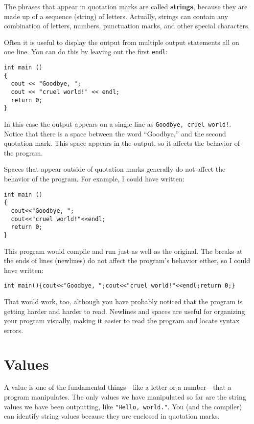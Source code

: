 
The phrases that appear in quotation marks are called {\bf strings},
because they are made up of a sequence (string) of letters.  Actually,
strings can contain any combination of letters, numbers, punctuation
marks, and other special characters.


Often it is useful to display the output from multiple output
statements all on one line.  You can do this by leaving out
the first {\tt endl}:

\begin{lstlisting}
int main ()
{
  cout << "Goodbye, ";
  cout << "cruel world!" << endl;
  return 0;
}
\end{lstlisting}
%
In this case the output appears on a single line as
{\tt Goodbye, cruel world!}.  Notice that there is a space
between the word ``Goodbye,'' and the second quotation mark.
This space appears in the output, so it affects the behavior
of the program.

Spaces that appear outside of quotation marks generally do
not affect the behavior of the program.  For example, I
could have written:

\begin{lstlisting}
int main ()
{
  cout<<"Goodbye, ";
  cout<<"cruel world!"<<endl;
  return 0;
}
\end{lstlisting}
%
This program would compile and run just as well as the original.
The breaks at the ends of lines (newlines) do not affect
the program's behavior either, so I could have written:

\begin{lstlisting}
int main(){cout<<"Goodbye, ";cout<<"cruel world!"<<endl;return 0;}
\end{lstlisting}
%
That would work, too, although you have probably noticed that
the program is getting harder and harder to read.  Newlines and
spaces are useful for organizing your program visually, making
it easier to read the program and locate syntax errors.

\section{Values}

A value is one of the fundamental things---like a letter or
a number---that a program manipulates.  The only values we have
manipulated so far are the string values we have been outputting, like
{\tt "Hello, world."}.  You (and the compiler) can identify
string values because they are enclosed in quotation marks.

